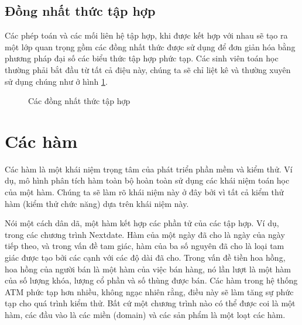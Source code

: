 \documentclass[11pt,a4paper,oneside]{article}
\begin{document}
\subsection {Đồng nhất thức tập hợp}
Các phép toán và các mối liên hệ tập hợp, khi được kết hợp với nhau sẽ tạo ra một lớp quan trọng gồm các đồng nhất thức được sử dụng để đơn giản hóa bằng phương pháp đại số các biểu thức tập hợp phức tạp. Các sinh viên toán học thường phải bắt đầu từ tất cả điệu này, chúng ta sẽ chỉ liệt kê và thường xuyên sử dụng chúng như ở hình \ref{fig:mtran_ima4}.
\begin{figure}[htb]
\setlength\fboxsep{1mm}
\setlength\fboxrule{1pt}
\begin{center}
\caption{Các đồng nhất thức tập hợp}
\label{fig:mtran_ima4}
\end{center}
\end{figure}

\section{Các hàm}
Các hàm là một khái niệm trọng tâm của phát triển phần mềm và kiểm thử. Ví dụ, mô hình phân tích hàm toàn bộ hoàn toàn sử dụng các khái niệm toán học của một hàm. Chúng ta sẽ làm rõ khái niệm này ở đây bởi vì tất cả kiểm thử hàm (kiểm thử chức năng) dựa trên khái niệm này.

Nói một cách dân dã, một hàm kết hợp các phần tử của các tập hợp. Ví dụ, trong các chương trình Nextdate. Hàm của một ngày đã cho là ngày của ngày tiếp theo, và trong vấn đề tam giác, hàm của ba số nguyên đã cho là loại tam giác được tạo bởi các cạnh với các độ dài đã cho. Trong vấn đề tiền hoa hồng, hoa hồng của người bán là một hàm của việc bán hàng, nó lần lượt là một hàm của số lượng khóa, lượng cổ phần và số thùng được bán. Các hàm trong hệ thống ATM phức tạp hơn nhiều, không ngạc nhiên rằng, điều này sẽ làm tăng sự phức tạp cho quá trình kiểm thử. 
Bất cứ một chương trình nào có thể được coi là một hàm, các đầu vào là các miền (domain) và các sản phẩm là một loạt các hàm. 
\end{document}
